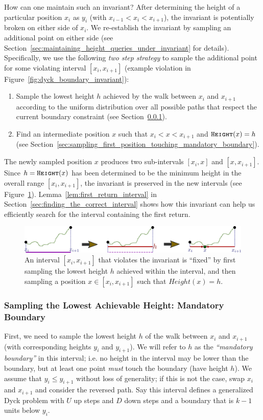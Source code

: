How can one maintain such an invariant?
After determining the height of a particular position $x_i$ as $y_i$ (with $x_{i-1} < x_i < x_{i+1}$),
the invariant is potentially broken on either side of $x_i$.
We re-establish the invariant by sampling an additional point on either side
(see Section~\ref{sec:maintaining_height_queries_under_invariant} for details).
Specifically, we use the following \emph{two step strategy} to sample the additional point for some violating interval $[x_i, x_{i+1}]$
(example violation in Figure~\ref{fig:dyck_boundary_invariant}):
\begin{enumerate}
    \item Sample the lowest height $h$ achieved by the walk between $x_i$ and $x_{i+1}$ according to
    the uniform distribution over all possible paths that respect the current boundary constraint
    (see Section~\ref{sec:sampling_the_lowest_achievable_height}).
    \item Find an intermediate position $x$ such that $x_i < x < x_{i+1}$ and $\texttt{\textsc{Height}}(x) = h$
    (see Section~\ref{sec:sampling_first_position_touching_mandatory_boundary}).
\end{enumerate}
The newly sampled position $x$ produces two sub-intervals $[x_i, x]$ and $[x, x_{i+1}]$.
Since $h = \texttt{\textsc{Height}}(x)$ has been determined to be the minimum height in the overall range $[x_i, x_{i+1}]$,
the invariant is preserved in the new intervals (see Figure~\ref{fig:dyck_invariant_preserve}).
Lemma~\ref{lem:first_return_interval} in Section~\ref{sec:finding_the_correct_interval}
shows how this invariant can help us efficiently search for the interval containing the first return.
\begin{figure}[htpb]
    \centering
    \includegraphics[width=\textwidth]{images/dyck_invariant_preserve.pdf}
    \caption{An interval $[x_i, x_{i+1}]$ that violates the invariant is ``fixed'' by first sampling the lowest height $h$ achieved within the interval,
    and then sampling a position $x\in [x_i, x_{i+1}]$ such that $Height(x) = h$.}
    \label{fig:dyck_invariant_preserve}
\end{figure}


\subsubsection{Sampling the Lowest Achievable Height: Mandatory Boundary}
\label{sec:sampling_the_lowest_achievable_height}
First, we need to sample the lowest height $h$ of the walk between $x_i$ and $x_{i+1}$ (with corresponding heights $y_i$ and $y_{i+1}$).
We will refer to $h$ as the \emph{``mandatory boundary''} in this interval;
i.e. no height in the interval may be lower than the boundary, but at least one point \emph{must} touch the boundary (have height $h$).
We assume that $y_i\le y_{i+1}$ without loss of generality; if this is not the case, swap $x_i$ and $x_{i+1}$ and consider the reversed path.
Say this interval defines a generalized Dyck problem with $U$ up steps and $D$ down steps and a boundary that is $k-1$ units below $y_i$.

